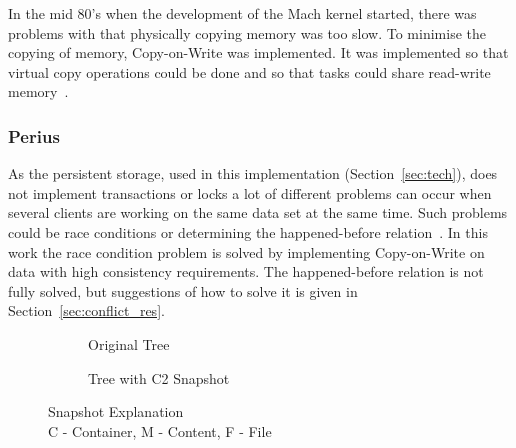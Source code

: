 \documentclass[a4paper,12pt]{article}
\newcounter{subsubsubsection}[subsubsection]
\begin{document}
In the mid 80's when the development of the Mach kernel started, there was problems with that
physically copying memory was too slow. To minimise the copying of memory, Copy-on-Write was
implemented. It was implemented so that virtual copy operations could be done and so that tasks
could share read-write memory~\cite{MACH}.

\subsubsection{Perius}
As the persistent storage, used in this implementation (Section~\ref{sec:tech}), does
not implement transactions or locks a lot of different problems can occur when several clients are
working on the same data set at the same time. Such problems could be race conditions or determining
the happened-before relation~\cite{LAMPORT}. In this work the race condition problem is solved by 
implementing Copy-on-Write on data with high consistency requirements. The happened-before relation
is not fully solved, but suggestions of how to solve it is given in Section~\ref{sec:conflict_res}.

\begin{figure}[H] 
    \centering
    \begin{subfigure}{.3\textwidth}
        \centering
        \caption{Original Tree}
        \label{fig:orignal_tree}
    \end{subfigure}\qquad
    \begin{subfigure}{.4\textwidth}
        \centering
         \caption{Tree with C2 Snapshot}
         \label{fig:snapshot_tree}
    \end{subfigure}
    \caption{Snapshot Explanation\\ C - Container, M - Content, F - File}
    \label{fig:snapshot_expl}
\end{figure}
\end{document}
